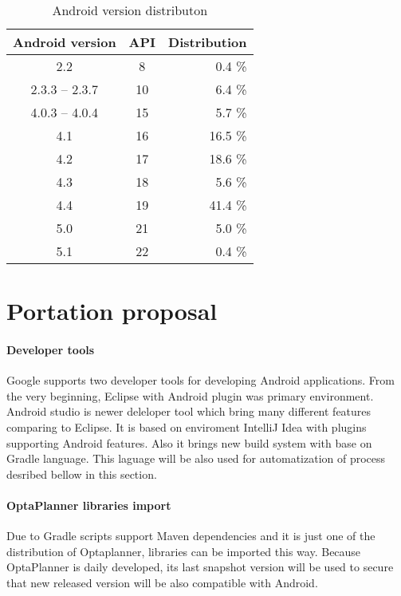 \begin {table}[h!]
    \begin{tabular}{|c|c|r|}
        \hline
        Android version   & API   & Distribution  \\ \hline \hline
        2.2               & 8     & 0.4 \%        \\ \hline
        2.3.3 -- 2.3.7    & 10    & 6.4 \%        \\ \hline
        4.0.3 -- 4.0.4    & 15    & 5.7 \%        \\ \hline
        4.1               & 16    & 16.5 \%       \\ \hline
        4.2               & 17    & 18.6 \%       \\ \hline
        4.3               & 18    & 5.6 \%        \\ \hline
        4.4               & 19    & 41.4 \%       \\ \hline
        5.0               & 21    & 5.0 \%        \\ \hline
        5.1               & 22    & 0.4 \%        \\ \hline
    \end{tabular}
    \centering
    \caption{Android version distributon \cite{Dashboards}}
    \label{distributon}
\end{table}


\section{Portation proposal}

\paragraph{Developer tools}
Google supports two developer tools for developing Android applications. From the very beginning, Eclipse with Android
plugin was primary environment. Android studio is newer deleloper tool which bring many different features comparing to
Eclipse. It is based on enviroment IntelliJ Idea with plugins supporting Android features. Also it brings
new build system with base on Gradle language. This laguage will be also used for automatization of process desribed
bellow in this section.

\paragraph{OptaPlanner libraries import}
Due to Gradle scripts support Maven dependencies and it is just one of the distribution of Optaplanner, libraries can
be imported this way. Because OptaPlanner is daily developed, its last snapshot version will be used to secure that new
released version will be also compatible with Android.

